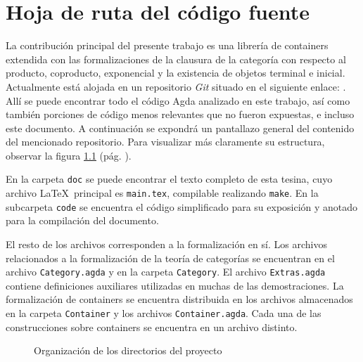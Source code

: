 \chapter{Hoja de ruta del código fuente}\label{guia}

La contribución principal del presente trabajo es una librería de containers extendida con las formalizaciones de la clausura de la categoría con respecto al producto, coproducto, exponencial y la existencia de objetos terminal e inicial. Actualmente está alojada en un repositorio {\it Git} situado en el siguiente enlace: \gitcode. Allí se puede encontrar todo el código Agda analizado en este trabajo, así como también porciones de código menos relevantes que no fueron expuestas, e incluso este documento. A continuación se expondrá un pantallazo general del contenido del mencionado repositorio. Para visualizar más claramente su estructura, observar la figura \ref{fig:map} (pág. \pageref{fig:map}).

En la carpeta \texttt{doc} se puede encontrar el texto completo de esta tesina, cuyo archivo \LaTeX\ principal es \texttt{main.tex}, compilable realizando \texttt{make}. En la subcarpeta \texttt{code} se encuentra el código simplificado para su exposición y anotado para la compilación del documento.

El resto de los archivos corresponden a la formalización en sí. Los archivos relacionados a la formalización de la teoría de categorías se encuentran en el archivo \texttt{Category.agda} y en la carpeta \texttt{Category}. El archivo \texttt{Extras.agda} contiene definiciones auxiliares utilizadas en muchas de las demostraciones. La formalización de containers se encuentra distribuida en los archivos almacenados en la carpeta \texttt{Container} y los archivos \texttt{Container.agda}.  
Cada una de las construcciones sobre containers se encuentra en un archivo distinto.

\begin{figure}[h]
\caption{Organización de los directorios del proyecto}\label{fig:map}
\end{figure}
